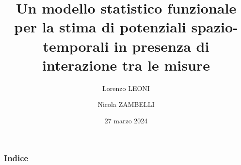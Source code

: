 \documentclass[aspectratio=169]{beamer}
\title{Un modello statistico funzionale per la stima di potenziali spazio-temporali in presenza di interazione tra le misure}
\author[L. Leoni, N. Zambelli]{Lorenzo LEONI \and Nicola ZAMBELLI}
\institute[Università degli Studi di Bergamo]{Dipartimento di Ingegneria Gestionale, delll'Informazione e della Produzione}
\date{27 marzo 2024}
\begin{document}
	
	\begin{frame}
		\titlepage
	\end{frame}
	
	\begin{frame}
		\frametitle{Indice}
		\tableofcontents
	\end{frame}
	
	
	
	
	
	
\end{document}

